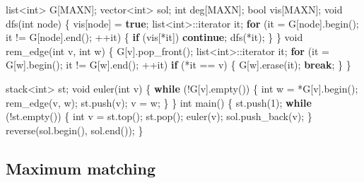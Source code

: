 \documentclass[10pt,]{article}
\newenvironment{Shaded}{}{}
\newcommand{\KeywordTok}[1]{\textcolor[rgb]{0.00,0.44,0.13}{\textbf{{#1}}}}
\newcommand{\DataTypeTok}[1]{\textcolor[rgb]{0.56,0.13,0.00}{{#1}}}
\newcommand{\DecValTok}[1]{\textcolor[rgb]{0.25,0.63,0.44}{{#1}}}
\newcommand{\NormalTok}[1]{{#1}}
\begin{document}
\begin{Shaded}
\begin{Highlighting}[]
\NormalTok{list<}\DataTypeTok{int}\NormalTok{> G[MAXN];}
\NormalTok{vector<}\DataTypeTok{int}\NormalTok{> sol;}
\DataTypeTok{int} \NormalTok{deg[MAXN];}
\DataTypeTok{bool} \NormalTok{vis[MAXN];}
\DataTypeTok{void} \NormalTok{dfs(}\DataTypeTok{int} \NormalTok{node) \{}
  \NormalTok{vis[node] = }\KeywordTok{true}\NormalTok{;}
  \NormalTok{list<}\DataTypeTok{int}\NormalTok{>::iterator it;}
  \KeywordTok{for} \NormalTok{(it = G[node].begin(); it != G[node].end(); ++it) \{}
    \KeywordTok{if} \NormalTok{(vis[*it])}
      \KeywordTok{continue}\NormalTok{;}
    \NormalTok{dfs(*it);}
  \NormalTok{\}}
\NormalTok{\}}
\DataTypeTok{void} \NormalTok{rem_edge(}\DataTypeTok{int} \NormalTok{v, }\DataTypeTok{int} \NormalTok{w) \{}
  \NormalTok{G[v].pop_front();}
  \NormalTok{list<}\DataTypeTok{int}\NormalTok{>::iterator it;}
  \KeywordTok{for} \NormalTok{(it = G[w].begin(); it != G[w].end(); ++it)}
    \KeywordTok{if} \NormalTok{(*it == v) \{}
      \NormalTok{G[w].erase(it);}
      \KeywordTok{break}\NormalTok{;}
    \NormalTok{\}}
\NormalTok{\}}

\NormalTok{stack<}\DataTypeTok{int}\NormalTok{> st;}
\DataTypeTok{void} \NormalTok{euler(}\DataTypeTok{int} \NormalTok{v) \{}
  \KeywordTok{while} \NormalTok{(!G[v].empty()) \{}
    \DataTypeTok{int} \NormalTok{w = *G[v].begin();}
    \NormalTok{rem_edge(v, w);}
    \NormalTok{st.push(v);}
    \NormalTok{v = w;}
  \NormalTok{\}}
\NormalTok{\}}
\DataTypeTok{int} \NormalTok{main() \{}
  \NormalTok{st.push(}\DecValTok{1}\NormalTok{);}
  \KeywordTok{while} \NormalTok{(!st.empty()) \{}
    \DataTypeTok{int} \NormalTok{v = st.top();}
    \NormalTok{st.pop();}
    \NormalTok{euler(v);}
    \NormalTok{sol.push_back(v);}
  \NormalTok{\}}
  \NormalTok{reverse(sol.begin(), sol.end());}
\NormalTok{\}}
\end{Highlighting}
\end{Shaded}

\subsection{Maximum matching}
\end{document}
